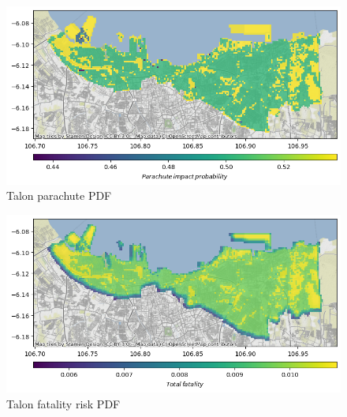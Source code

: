 \documentclass[12pt]{report}
\begin{document}
        \begin{figure}[H]
            \centering
            \includegraphics[width=\textwidth]{Plot/talon/parachute_pdf.png}
            \caption{Talon parachute PDF}
        \end{figure}
        \begin{figure}[H]
            \centering
            \includegraphics[width=\textwidth]{Plot/talon/total_fatality.png}
            \caption{Talon fatality risk PDF}
        \end{figure}
\end{document}
